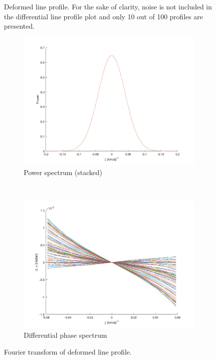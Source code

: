 \begin{figure}[tbp]
    \caption[Deformed line profile]{Deformed line profile. For the sake of clarity, noise is not included in  
    the differential line profile plot and only 10 out of 100 profiles are presented.}
\label{fig:line_profiles_deformation}
\end{figure}	

\begin{figure}[tbp]	
    \begin{subfigure}[b]{0.49\textwidth}
        \includegraphics[width=\textwidth]{./Figures/Methods/LPD2-FT_power.png}
        \caption{Power spectrum (stacked)}
    \end{subfigure}
	~
    \begin{subfigure}[b]{0.49\textwidth}
        \includegraphics[width=\textwidth]{./Figures/Methods/LPD4-Relative_phase_angle.png}
        \caption{Differential phase spectrum}
        \label{fig:dps_LPD}
    \end{subfigure}	
    
    \caption[Fourier transform of deformed line profile]{Fourier transform of deformed line profile.}
\label{fig:FT_process_LPD}
\end{figure}    

